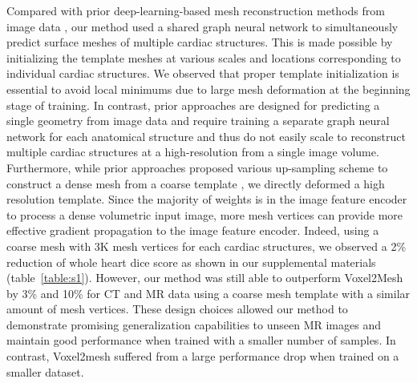 \documentclass[times,review,preprint,authoryear]{elsarticle}
\begin{document}
Compared with prior deep-learning-based mesh reconstruction methods from image data \citep{Pixel2Mesh, Voxel2Mesh}, our method used a shared graph neural network to simultaneously predict surface meshes of multiple cardiac structures. This is made possible by initializing the template meshes at various scales and locations corresponding to individual cardiac structures. We observed that proper template initialization is essential to avoid local minimums due to large mesh deformation at the beginning stage of training. In contrast, prior approaches are designed for predicting a single geometry from image data and require training a separate graph neural network for each anatomical structure and thus do not easily scale to reconstruct multiple cardiac structures at a high-resolution from a single image volume. Furthermore, while prior approaches proposed various up-sampling scheme to construct a dense mesh from a coarse template \citep{Voxel2Mesh, Pixel2Mesh}, we directly deformed a high resolution template. Since the majority of weights is in the image feature encoder to process a dense volumetric input image, more mesh vertices can provide more effective gradient propagation to the image feature encoder. Indeed, using a coarse mesh with 3K mesh vertices for each cardiac structures, we observed a 2\% reduction of whole heart dice score as shown in our supplemental materials (table~\ref{table:s1}). However, our method was still able to outperform Voxel2Mesh by 3\% and 10\% for CT and MR data using a coarse mesh template with a similar amount of mesh vertices. These design choices allowed our method to demonstrate promising generalization capabilities to unseen MR images and maintain good performance when trained with a smaller number of samples. In contrast, Voxel2mesh suffered from a large performance drop when trained on a smaller dataset. 
\end{document}
